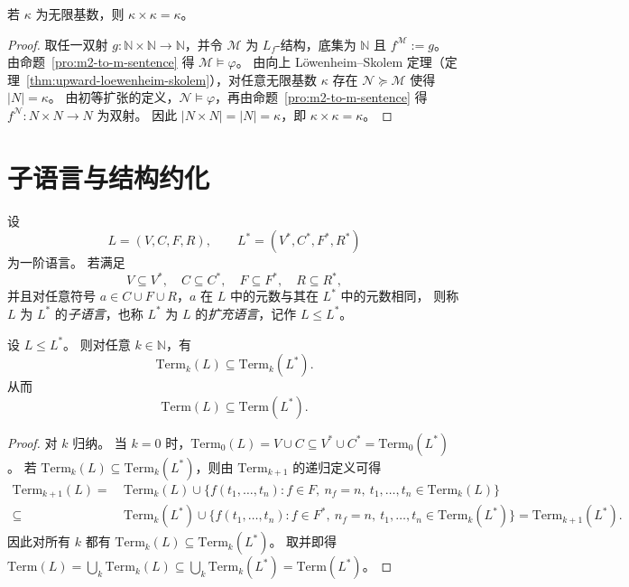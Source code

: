 \documentclass[lang=cn,a4paper,newtx,section]{elegantbook}
\begin{document}
 \begin{theorem}
 \label{infinite-cardinal-square}
 若 $\kappa$ 为无限基数，则 $\kappa\times\kappa=\kappa$。
 \end{theorem}

 \begin{proof}
 取任一双射 $g:\mathbb N\times\mathbb N\to\mathbb N$，并令 $\mathcal M$ 为 $L_f$-结构，底集为 $\mathbb N$ 且 $f^{\mathcal M}:=g$。
 由命题~\ref{pro:m2-to-m-sentence} 得 $\mathcal M\models\varphi$。
 由向上 Löwenheim--Skolem 定理（定理~\ref{thm:upward-loewenheim-skolem}），对任意无限基数 $\kappa$ 存在 $\mathcal N\succcurlyeq\mathcal M$ 使得 $\lvert N\rvert=\kappa$。
 由初等扩张的定义，$\mathcal N\models\varphi$，再由命题~\ref{pro:m2-to-m-sentence} 得 $f^{\mathcal N}:N\times N\to N$ 为双射。
 因此 $\lvert N\times N\rvert=\lvert N\rvert=\kappa$，即 $\kappa\times\kappa=\kappa$。
 \end{proof}

\section{子语言与结构约化}

 \begin{definition}[子语言与扩充语言]
 \label{sublanguage}
 设
 \[
   L=(V,C,F,R),\qquad L^*=(V^*,C^*,F^*,R^*)
 \]
 为一阶语言。
 若满足
 \[
   V\subseteq V^*,\quad C\subseteq C^*,\quad F\subseteq F^*,\quad R\subseteq R^*,
 \]
 并且对任意符号 $a\in C\cup F\cup R$，$a$ 在 $L$ 中的元数与其在 $L^*$ 中的元数相同，
 则称 $L$ 为 $L^*$ 的\emph{子语言}，也称 $L^*$ 为 $L$ 的\emph{扩充语言}，记作 $L\le L^*$。
 \end{definition}

 \begin{lemma}
 设 $L\le L^*$。
 则对任意 $k\in\mathbb N$，有
 \[
   \mathrm{Term}_k(L)\subseteq \mathrm{Term}_k(L^*).
 \]
 从而
 \[
   \mathrm{Term}(L)\subseteq \mathrm{Term}(L^*).
 \]
 \end{lemma}

 \begin{proof}
 对 $k$ 归纳。
 当 $k=0$ 时，$\mathrm{Term}_0(L)=V\cup C\subseteq V^*\cup C^*=\mathrm{Term}_0(L^*)$。
 若 $\mathrm{Term}_k(L)\subseteq\mathrm{Term}_k(L^*)$，则由 $\mathrm{Term}_{k+1}$ 的递归定义可得
 \[
   \begin{aligned}
   \mathrm{Term}_{k+1}(L)
   =&\ \mathrm{Term}_k(L)\cup\bigl\{f(t_1,\dots,t_n): f\in F,\ n_f=n,\ t_1,\dots,t_n\in\mathrm{Term}_k(L)\bigr\}\\
   \subseteq&\ \mathrm{Term}_k(L^*)\cup\bigl\{f(t_1,\dots,t_n): f\in F^*,\ n_f=n,\ t_1,\dots,t_n\in\mathrm{Term}_k(L^*)\bigr\}
   =\mathrm{Term}_{k+1}(L^*).
   \end{aligned}
 \]
 因此对所有 $k$ 都有 $\mathrm{Term}_k(L)\subseteq\mathrm{Term}_k(L^*)$。
 取并即得 $\mathrm{Term}(L)=\bigcup_k\mathrm{Term}_k(L)\subseteq\bigcup_k\mathrm{Term}_k(L^*)=\mathrm{Term}(L^*)$。
 \end{proof}
\end{document}
